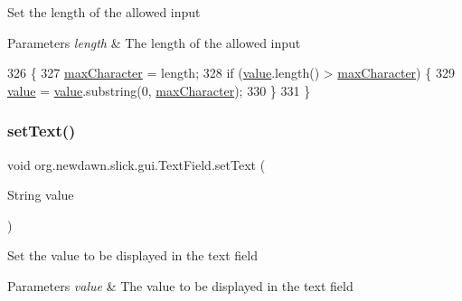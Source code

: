Set the length of the allowed input


\begin{DoxyParams}{Parameters}
{\em length} & The length of the allowed input \\
\hline
\end{DoxyParams}

\begin{DoxyCode}
326                                          \{
327         \mbox{\hyperlink{classorg_1_1newdawn_1_1slick_1_1gui_1_1_text_field_a51e223641f99aad33d859574bc6b2722}{maxCharacter}} = length;
328         \textcolor{keywordflow}{if} (\mbox{\hyperlink{classorg_1_1newdawn_1_1slick_1_1gui_1_1_text_field_a23c571aa0aa30ccbc28a090a06a444b7}{value}}.length() > \mbox{\hyperlink{classorg_1_1newdawn_1_1slick_1_1gui_1_1_text_field_a51e223641f99aad33d859574bc6b2722}{maxCharacter}}) \{
329             \mbox{\hyperlink{classorg_1_1newdawn_1_1slick_1_1gui_1_1_text_field_a23c571aa0aa30ccbc28a090a06a444b7}{value}} = \mbox{\hyperlink{classorg_1_1newdawn_1_1slick_1_1gui_1_1_text_field_a23c571aa0aa30ccbc28a090a06a444b7}{value}}.substring(0, \mbox{\hyperlink{classorg_1_1newdawn_1_1slick_1_1gui_1_1_text_field_a51e223641f99aad33d859574bc6b2722}{maxCharacter}});
330         \}
331     \}
\end{DoxyCode}
\mbox{\label{classorg_1_1newdawn_1_1slick_1_1gui_1_1_text_field_a5c926f3fc3503b4e197ebca868b101c0}} 
\subsubsection{\texorpdfstring{set\+Text()}{setText()}}
{\footnotesize\ttfamily void org.\+newdawn.\+slick.\+gui.\+Text\+Field.\+set\+Text (\begin{DoxyParamCaption}\item[{String}]{value }\end{DoxyParamCaption})\hspace{0.3cm}{\ttfamily [inline]}}

Set the value to be displayed in the text field


\begin{DoxyParams}{Parameters}
{\em value} & The value to be displayed in the text field \\
\hline
\end{DoxyParams}

